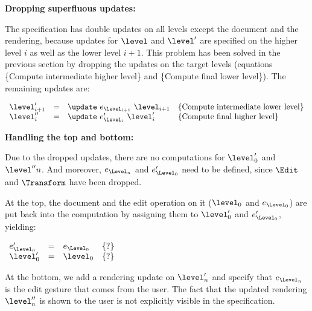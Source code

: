
\bigskip
{\bf Dropping superfluous updates:}

The specification has double updates on all levels except the document and the rendering, because updates for $\level$ and $\level'$ are specified on the higher level $i$ as well as the lower level $i+1$. This problem has been solved in the previous section by dropping the updates on the target levels (equations \{Compute intermediate higher level\} and \{Compute final lower level\}). The remaining updates are:

\begin{small}\( \begin{array}{lcll} 
\level'_{i+1} 	& = & \update~e_{\Level_{i+1}}~\level_{i+1}                 & \text{\{Compute intermediate lower level\}}\\
\level''_{i} & = & \update~e'_{\Level_{i}}~\level'_{i}                 & \text{\{Compute final higher level\}}\\
\end{array}\)
\end{small}

\bigskip
{\bf Handling the top and bottom:}

Due to the dropped updates, there are no computations for $\level'_0$ and $\level''{n}$. And moreover, $e_{\Level_n}$ and $e'_{\Level_0}$ need to be defined, since $\Edit$ and $\Transform$ have been dropped. 

At the top, the document and the edit operation on it ($\level_0$ and $e_{\Level_0}$) are put back into the computation by assigning them to $\level'_0$ and $e'_{\Level_0}$, yielding:

\begin{small}\( \begin{array}{lcll} 
e'_{\Level_{0}}  & = & e_{\Level_{0}}		& \text{\{?\}}\\
\level'_{0} & = & \level_{0}				& \text{\{?\}}\\
\end{array}\)
\end{small}

At the bottom, we add a rendering update on $\level'_n$ and specify that $e_{\Level_n}$ is the edit gesture that comes from the user. The fact that the updated rendering $\level''_n$ is shown to the user is not explicitly visible in the specification.

